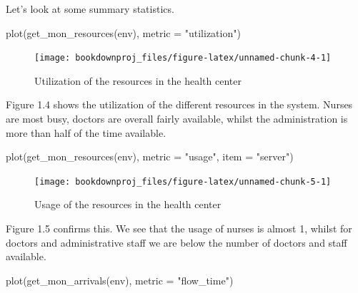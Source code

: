 \documentclass[
]{book}
\newenvironment{Shaded}{\begin{snugshade}}{\end{snugshade}}
\newcommand{\AttributeTok}[1]{\textcolor[rgb]{0.77,0.63,0.00}{#1}}
\newcommand{\FunctionTok}[1]{\textcolor[rgb]{0.00,0.00,0.00}{#1}}
\newcommand{\NormalTok}[1]{#1}
\newcommand{\StringTok}[1]{\textcolor[rgb]{0.31,0.60,0.02}{#1}}
\theoremstyle{definition}
\theoremstyle{definition}
\theoremstyle{definition}
\theoremstyle{definition}
\theoremstyle{remark}
\begin{document}
Let's look at some summary statistics.

\begin{Shaded}
\begin{Highlighting}[]
\FunctionTok{plot}\NormalTok{(}\FunctionTok{get\_mon\_resources}\NormalTok{(env), }\AttributeTok{metric =} \StringTok{"utilization"}\NormalTok{)}
\end{Highlighting}
\end{Shaded}

\begin{figure}

{\centering \texttt{[image: bookdownproj\_files/figure-latex/unnamed-chunk-4-1]} 

}

\caption{Utilization of the resources in the health center}\label{fig:unnamed-chunk-4}
\end{figure}

Figure 1.4 shows the utilization of the different resources in the system. Nurses are most busy, doctors are overall fairly available, whilst the administration is more than half of the time available.

\begin{Shaded}
\begin{Highlighting}[]
\FunctionTok{plot}\NormalTok{(}\FunctionTok{get\_mon\_resources}\NormalTok{(env), }\AttributeTok{metric =} \StringTok{"usage"}\NormalTok{, }\AttributeTok{item =} \StringTok{"server"}\NormalTok{)}
\end{Highlighting}
\end{Shaded}

\begin{figure}

{\centering \texttt{[image: bookdownproj\_files/figure-latex/unnamed-chunk-5-1]} 

}

\caption{Usage of the resources in the health center}\label{fig:unnamed-chunk-5}
\end{figure}

Figure 1.5 confirms this. We see that the usage of nurses is almost 1, whilst for doctors and administrative staff we are below the number of doctors and staff available.

\begin{Shaded}
\begin{Highlighting}[]
\FunctionTok{plot}\NormalTok{(}\FunctionTok{get\_mon\_arrivals}\NormalTok{(env), }\AttributeTok{metric =} \StringTok{"flow\_time"}\NormalTok{)}
\end{Highlighting}
\end{Shaded}
\end{document}
